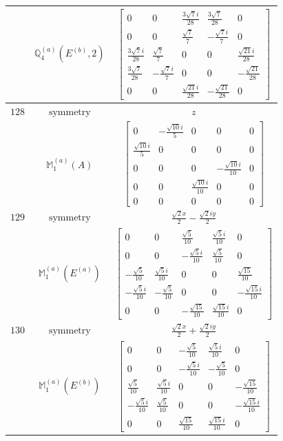 \documentclass[fleqn,8pt,landscape]{jsarticle}
\begin{document}
\begin{longtable}{ccc}
$  $ & $ \mathbb{Q}_{4}^{(a)}(E^{(b)},2) $ & $ \begin{bmatrix} 0 & 0 & \frac{3 \sqrt{7} i}{28} & \frac{3 \sqrt{7}}{28} & 0 \\ 0 & 0 & \frac{\sqrt{7}}{7} & - \frac{\sqrt{7} i}{7} & 0 \\ \frac{3 \sqrt{7} i}{28} & \frac{\sqrt{7}}{7} & 0 & 0 & \frac{\sqrt{21} i}{28} \\ \frac{3 \sqrt{7}}{28} & - \frac{\sqrt{7} i}{7} & 0 & 0 & - \frac{\sqrt{21}}{28} \\ 0 & 0 & \frac{\sqrt{21} i}{28} & - \frac{\sqrt{21}}{28} & 0 \end{bmatrix} $ \\ \hline
$ 128 $ & $ \text{symmetry} $ & $ z $ \\
$  $ & $ \mathbb{M}_{1}^{(a)}(A) $ & $ \begin{bmatrix} 0 & - \frac{\sqrt{10} i}{5} & 0 & 0 & 0 \\ \frac{\sqrt{10} i}{5} & 0 & 0 & 0 & 0 \\ 0 & 0 & 0 & - \frac{\sqrt{10} i}{10} & 0 \\ 0 & 0 & \frac{\sqrt{10} i}{10} & 0 & 0 \\ 0 & 0 & 0 & 0 & 0 \end{bmatrix} $ \\ \hline
$ 129 $ & $ \text{symmetry} $ & $ \frac{\sqrt{2} x}{2} - \frac{\sqrt{2} i y}{2} $ \\
$  $ & $ \mathbb{M}_{1}^{(a)}(E^{(a)}) $ & $ \begin{bmatrix} 0 & 0 & \frac{\sqrt{5}}{10} & \frac{\sqrt{5} i}{10} & 0 \\ 0 & 0 & - \frac{\sqrt{5} i}{10} & \frac{\sqrt{5}}{10} & 0 \\ - \frac{\sqrt{5}}{10} & \frac{\sqrt{5} i}{10} & 0 & 0 & \frac{\sqrt{15}}{10} \\ - \frac{\sqrt{5} i}{10} & - \frac{\sqrt{5}}{10} & 0 & 0 & - \frac{\sqrt{15} i}{10} \\ 0 & 0 & - \frac{\sqrt{15}}{10} & \frac{\sqrt{15} i}{10} & 0 \end{bmatrix} $ \\ \hline
$ 130 $ & $ \text{symmetry} $ & $ \frac{\sqrt{2} x}{2} + \frac{\sqrt{2} i y}{2} $ \\
$  $ & $ \mathbb{M}_{1}^{(a)}(E^{(b)}) $ & $ \begin{bmatrix} 0 & 0 & - \frac{\sqrt{5}}{10} & \frac{\sqrt{5} i}{10} & 0 \\ 0 & 0 & - \frac{\sqrt{5} i}{10} & - \frac{\sqrt{5}}{10} & 0 \\ \frac{\sqrt{5}}{10} & \frac{\sqrt{5} i}{10} & 0 & 0 & - \frac{\sqrt{15}}{10} \\ - \frac{\sqrt{5} i}{10} & \frac{\sqrt{5}}{10} & 0 & 0 & - \frac{\sqrt{15} i}{10} \\ 0 & 0 & \frac{\sqrt{15}}{10} & \frac{\sqrt{15} i}{10} & 0 \end{bmatrix} $ \\ \hline

\end{longtable}
\end{document}
